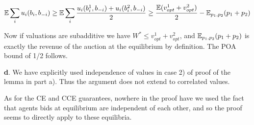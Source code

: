 $$
\mathbb{E} \sum_i u_i(b_i,b_{-i})\geq \mathbb{E} \sum_i \frac{u_i(b_i^1,b_{-i})+u_i(b_i^2,b_{-i})}{2} \geq \frac {\mathbb{E}(v^1_{opt}+v^2_{opt})}{2} - \mathbb{E}_{p_1,p_2}(p_1+p_2)
$$

Now if valuations are subadditive we have $W^*\leq v^1_{opt}+v^2_{opt}$, and $\mathbb{E}_{p_1,p_2}(p_1+p_2)$ is exactly the revenue of the auction at the equilibrium by definition. The POA bound of 1/2 follows.

\textbf{d}. We have explicitly used independence of values in case 2) of proof of the lemma in part a). Thus the argument does not extend to correlated values. 

As for the CE and CCE guarantees, nowhere in the proof have we used the fact that agents bids at equilibrium are independent of each other, and so the proof seems to directly apply to these equilibria. 